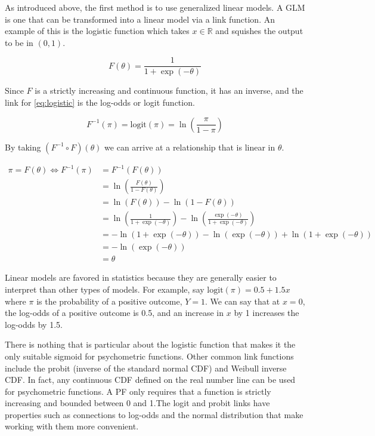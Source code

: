 \documentclass[11pt, oneside, openany]{scrbook}
\begin{document}
As introduced above, the first method is to use generalized linear models. A GLM is one that can be transformed into a linear model via a link function. An example of this is the logistic function which takes \(x \in \mathbb{R}\) and squishes the output to be in \((0, 1)\).

\begin{equation}
  F(\theta) = \frac{1}{1 + \exp\left(-\theta\right)}
  \label{eq:logistic}
\end{equation}

Since \(F\) is a strictly increasing and continuous function, it has an inverse, and the link for \eqref{eq:logistic} is the log-odds or logit function.

\begin{equation}
  F^{-1}(\pi) = \mathrm{logit}(\pi) = \ln\left(\frac{\pi}{1 - \pi}\right)
  \label{eq:logit}
\end{equation}

By taking \((F^{-1} \circ F)(\theta)\) we can arrive at a relationship that is linear in \(\theta\).

\begin{align*}
  \pi = F(\theta) \Longleftrightarrow F^{-1}(\pi) &= F^{-1}(F(\theta)) \\
  & = \ln\left(\frac{F(\theta)}{1 - F(\theta)}\right) \\
  &= \ln(F(\theta)) - \ln(1 - F(\theta)) \\
  &= \ln\left(\frac{1}{1 + \exp(-\theta)}\right) - \ln\left(\frac{\exp(-\theta)}{1 + \exp(-\theta)}\right) \\
  &= - \ln(1 + \exp(-\theta)) - \ln(\exp(-\theta)) + \ln(1 + \exp(-\theta)) \\
  &= - \ln(\exp(-\theta)) \\
  &= \theta
\end{align*}

Linear models are favored in statistics because they are generally easier to interpret than other types of models. For example, say \(\mathrm{logit}(\pi) = 0.5 + 1.5x\) where \(\pi\) is the probability of a positive outcome, \(Y=1\). We can say that at \(x = 0\), the log-odds of a positive outcome is 0.5, and an increase in \(x\) by 1 increases the log-odds by 1.5.

There is nothing that is particular about the logistic function that makes it the only suitable sigmoid for psychometric functions. Other common link functions include the probit (inverse of the standard normal CDF) and Weibull inverse CDF. In fact, any continuous CDF defined on the real number line can be used for psychometric functions. A PF only requires that a function is strictly increasing and bounded between 0 and 1.The logit and probit links have properties such as connections to log-odds and the normal distribution that make working with them more convenient.
\end{document}
